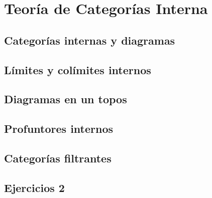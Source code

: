 \chapter{Teoría de Categorías Interna}
\label{chap:2}

\section{Categorías internas y diagramas}
\label{sec:2.1}

\section{Límites y colímites internos}
\label{sec:2.2}

\section{Diagramas en un topos}
\label{sec:2.3}

\section{Profuntores internos}
\label{sec:2.4}

\section{Categorías filtrantes}
\label{sec:2.5}

\section*{Ejercicios 2}
\label{sec:ejercicios-2}
